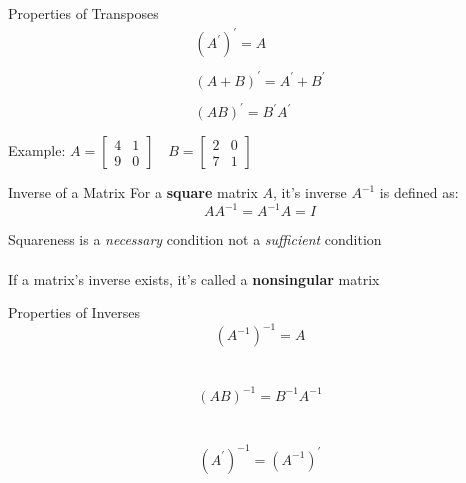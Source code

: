 \documentclass{./../../Latex/teaching_slides}
\begin{document}
\begin{frame}{Properties of Transposes}
$$
\begin{array}{l}
\left(A^{\prime}\right)^{\prime}=A \\~\\
(A+B)^{\prime}=A^{\prime}+B^{\prime} \\~\\
(A B)^{\prime}=B^{\prime} A^{\prime} \\~\\
\end{array}
$$
Example:
\( A=\left[\begin{array}{ll}4 & 1 \\ 9 & 0\end{array}\right] \quad B=\left[\begin{array}{ll}2 & 0 \\ 7 & 1\end{array}\right] \)
\end{frame}

\begin{frame}{Inverse of a Matrix}
For a \textbf{square} matrix $A$, it's inverse $A^{-1}$ is defined as:
$$
A A^{-1}=A^{-1} A=I
$$

\vspace{2em}
 Squareness is a \textit{necessary} condition not a \textit{sufficient} condition \\~\\
 If a matrix's inverse exists, it's called a \textbf{nonsingular} matrix
\end{frame}


\begin{frame}{Properties of Inverses}
$$ \left(A^{-1}\right)^{-1}=A $$ \\~\\
$$ (A B)^{-1}=B^{-1} A^{-1} $$ \\~\\
$$ \left(A^{\prime}\right)^{-1}=\left(A^{-1}\right)^{\prime} $$
\end{frame}
\end{document}
